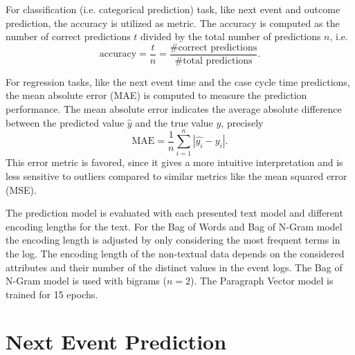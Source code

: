 For classification (i.e. categorical prediction) task, like next event and outcome prediction, the accuracy is utilized as metric.
The accuracy is computed as the number of correct predictions $t$ divided by the total number of predictions $n$, i.e. 
\begin{equation*}
	\textrm{accuracy} = \dfrac{t}{n} = \dfrac{\textrm{\# correct predictions}}{\textrm{\# total predictions}}.
\end{equation*}

For regression tasks, like the next event time and the case cycle time predictions, the mean absolute error (MAE) is computed to measure the prediction performance. The mean absolute error indicates the average absolute difference between the predicted value $\hat{y}$ and the true value $y$,  precisely
\begin{equation*}
	\textrm{MAE} = \dfrac{1}{n}\sum_{i=1}^{n}|\hat{y_i} - y_i|.
\end{equation*}
This error metric is favored, since it gives a more intuitive interpretation and is less sensitive to outliers compared to similar metrics like the mean squared error (MSE).

The prediction model is evaluated with each presented text model and different encoding lengths for the text.
For the Bag of Words and Bag of N-Gram model the encoding length is adjusted by only considering the most frequent terms in the log.
The encoding length of the non-textual data depends on the considered attributes and their number of the distinct values in the event logs.
The Bag of N-Gram model is used with bigrams ($n=2$).
The Paragraph Vector model is trained for 15 epochs.

\section{Next Event Prediction}

